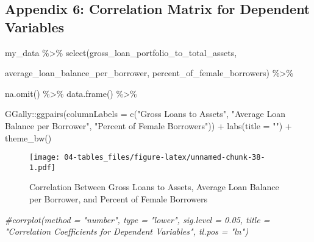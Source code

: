 \documentclass[a4paper,nobind]{templates/ociamthesis}
\newenvironment{Shaded}{\begin{snugshade}}{\end{snugshade}}
\newcommand{\AttributeTok}[1]{\textcolor[rgb]{0.77,0.63,0.00}{#1}}
\newcommand{\CommentTok}[1]{\textcolor[rgb]{0.56,0.35,0.01}{\textit{#1}}}
\newcommand{\FunctionTok}[1]{\textcolor[rgb]{0.00,0.00,0.00}{#1}}
\newcommand{\NormalTok}[1]{#1}
\newcommand{\SpecialCharTok}[1]{\textcolor[rgb]{0.00,0.00,0.00}{#1}}
\newcommand{\StringTok}[1]{\textcolor[rgb]{0.31,0.60,0.02}{#1}}
\renewenvironment{Shaded}
{
  \vspace{10pt}%
  \begin{snugshade}%
}{%
  \end{snugshade}%
  \vspace{8pt}%
}
\begin{document}
\begin{landscape}
\newpage

\hypertarget{appendix-6-correlation-matrix-for-dependent-variables}{%
\subsection{Appendix 6: Correlation Matrix for Dependent Variables}\label{appendix-6-correlation-matrix-for-dependent-variables}}

\begin{Shaded}
\begin{Highlighting}[]
\NormalTok{my\_data }\SpecialCharTok{\%\textgreater{}\%} \FunctionTok{select}\NormalTok{(gross\_loan\_portfolio\_to\_total\_assets, }
                
\NormalTok{                average\_loan\_balance\_per\_borrower, percent\_of\_female\_borrowers) }\SpecialCharTok{\%\textgreater{}\%} 
  
                \FunctionTok{na.omit}\NormalTok{() }\SpecialCharTok{\%\textgreater{}\%} \FunctionTok{data.frame}\NormalTok{() }\SpecialCharTok{\%\textgreater{}\%} 
  
\NormalTok{GGally}\SpecialCharTok{::}\FunctionTok{ggpairs}\NormalTok{(}\AttributeTok{columnLabels =} \FunctionTok{c}\NormalTok{(}\StringTok{"Gross Loans to Assets"}\NormalTok{, }\StringTok{"Average Loan Balance per Borrower"}\NormalTok{, }\StringTok{"Percent of Female Borrowers"}\NormalTok{)) }\SpecialCharTok{+} \FunctionTok{labs}\NormalTok{(}\AttributeTok{title =} \StringTok{""}\NormalTok{) }\SpecialCharTok{+} \FunctionTok{theme\_bw}\NormalTok{()}
\end{Highlighting}
\end{Shaded}

\begin{figure}
\centering
\texttt{[image: 04-tables\_files/figure-latex/unnamed-chunk-38-1.pdf]}
\caption{\label{fig:unnamed-chunk-38}Correlation Between Gross Loans to Assets, Average Loan Balance per Borrower, and Percent of Female Borrowers}
\end{figure}

\begin{Shaded}
\begin{Highlighting}[]
  \CommentTok{\#corrplot(method = "number", type = "lower", sig.level = 0.05, title = "Correlation Coefficients for Dependent Variables", tl.pos = "ln")}
\end{Highlighting}
\end{Shaded}


\end{landscape}
\end{document}
